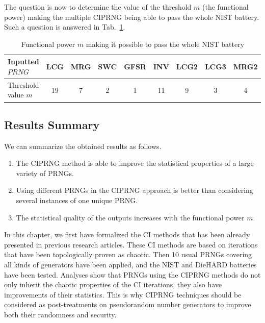 The question is now to determine the value of the threshold $m$ (the functional power) making 
the multiple CIPRNG being able to pass the whole NIST battery.
Such a question is answered in Tab.~\ref{threshold}.


\begin{table}
\renewcommand{\arraystretch}{1.3}
\caption{Functional power $m$ making it possible to pass the whole NIST battery}
\label{threshold}
\centering
  \begin{tabular}{|l||c|c|c|c|c|c|c|c|}
    \hline
Inputted $PRNG$ & LCG & MRG & SWC & GFSR & INV& LCG2 & LCG3  & MRG2 \\ \hline\hline
Threshold  value $m$& 19 & 7  & 2& 1 & 11& 9& 3& 4\\ \hline\hline
\end{tabular}
\end{table}

\subsection{Results Summary}

We can summarize the obtained results as follows.
\begin{enumerate}
\item The CIPRNG method is able to improve the statistical properties of a large variety of PRNGs.
\item Using different PRNGs in the CIPRNG approach is better than considering several instances of one unique PRNG.
\item The statistical quality of the outputs increases with the functional power $m$.
\end{enumerate}

In this chapter, we first have formalized the CI methods that has been already presented in previous research articles.
These CI methods are based on iterations that have been topologically proven as chaotic.
Then 10 usual PRNGs covering all kinds of generators have been applied, and the NIST and DieHARD batteries have been tested.
Analyses show that PRNGs using the CIPRNG methods do not only inherit the chaotic properties of the
CI iterations, they also have improvements of their statistics.
This is why CIPRNG techniques should be considered as post-treatments on pseudorandom number generators to improve both their randomness and security.


